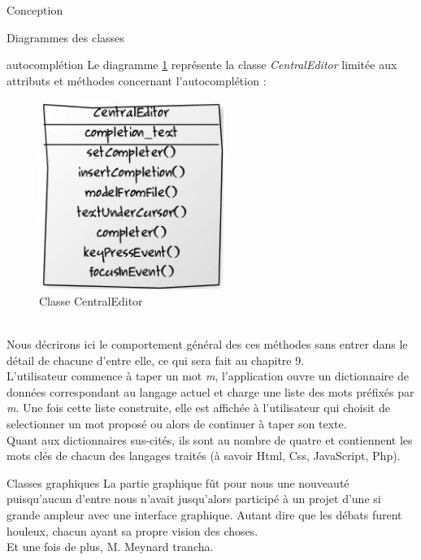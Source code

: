 \documentclass[a4paper, 12pt]{report}
\begin{document}
\begin{part}{Conception}
\begin{chapter}{Diagrammes des classes}
\begin{section}{\Gls{autocomplétion}}
				Le diagramme \ref{orangina} représente la classe \emph{CentralEditor} limitée aux attributs et méthodes concernant
				l'\gls{autocomplétion} :
				\begin{figure}[ht]
					\begin{center}
						\includegraphics[width=6cm]{images/classesAutoCompletion.jpg}
						\caption{Classe CentralEditor}
						\label{orangina}
					\end{center}
				\end{figure}~\\

				Nous décrirons ici le comportement général des ces méthodes sans entrer dans le détail de chacune d'entre elle,
				ce qui sera fait au chapitre 9.\\

				L'utilisateur commence à taper un mot \emph{m}, l'application ouvre un dictionnaire de données correspondant au langage actuel et 
				charge une liste des mots préfixés par \emph{m}. Une fois cette liste construite, elle est affichée à l'utilisateur qui choisit de
				selectionner un mot proposé ou alors de continuer à taper son texte.\\

				Quant aux dictionnaires sus-cités, ils sont au nombre de quatre et contiennent les mots clés de chacun des langages traités (à savoir
				\gls{Html}, \gls{Css}, \gls{JavaScript}, \gls{Php}).
			\end{section}
			\begin{section}{Classes graphiques}
				La partie graphique fût pour nous une nouveauté puisqu'aucun d'entre nous n'avait jusqu'alors participé à un projet d'une si grande
				ampleur avec une interface graphique. Autant dire que les débats furent houleux, chacun ayant sa propre vision des choses.\\
				Et une fois de plus, M. Meynard trancha.\\


\end{section}
\end{chapter}
\end{part}
\end{document}
